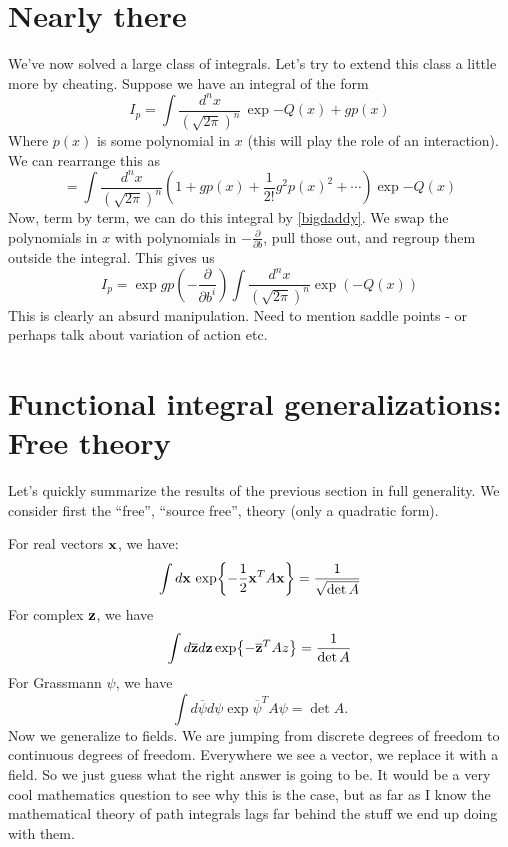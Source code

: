 \documentclass[main.tex]{subfiles}
\begin{document}
\section{Nearly there}
We've now solved a large class of integrals. Let's try to extend this class a little more by cheating. Suppose we have an integral of the form 
\[
I_p = \int \frac{d^n x}{(\sqrt{2\pi})^n} \, \exp{-Q(x) + g p(x)}
\]
Where $p(x)$ is some polynomial in $x$ (this will play the role of an interaction). We can rearrange this as 
\[
= \int \frac{d^n x}{(\sqrt{2\pi})^n} \left(
1 + g p(x) + \frac{1}{2!}g^2 p(x)^2 + \cdots 
\right) \exp{-Q(x)}
\]
Now, term by term, we can do this integral by \ref{bigdaddy}. We swap the polynomials in $x$ with polynomials in $-\frac{\partial}{\partial b}$, pull those out, and regroup them outside the integral. This gives us
\[
I_p = \exp{g p \left( -\frac{\partial}{\partial b^i} \right)} \int \frac{d^n x}{(\sqrt{2\pi})^n}\exp (-Q(x))
\]
This is clearly an absurd manipulation. Need to mention saddle points - or perhaps talk about variation of action etc.

\newpage
\section{Functional integral generalizations: Free theory}
Let's quickly summarize the results of the previous section in full generality. We consider first the ``free'', ``source free'', theory (only a quadratic form). 

For real vectors $\mathbf{x}$, we have:
\begin{equation}
\int d\mathbf{x} \, \exp{-\frac{1}{2} \mathbf{x}^T A \mathbf{x} } = \frac{1}{\sqrt{\det A}}
\end{equation}
For complex $\mathbf{z}$, we have
\begin{equation}
\int d\overline{\mathbf{z}} d\mathbf{z} \exp{-\overline{\mathbf{z}}^T A z } = \frac{1}{\det A}
\end{equation}
For Grassmann $\psi$, we have
\begin{equation}
\int d\overline{\psi} d\psi \exp{\overline{\psi}^T A \psi} = \det A.
\end{equation}
Now we generalize to fields. We are jumping from discrete degrees of freedom to continuous degrees of freedom. Everywhere we see a vector, we replace it with a field. So we just guess what the right answer is going to be. It would be a very cool mathematics question to see why this is the case, but as far as I know the mathematical theory of path integrals lags far behind the stuff we end up doing with them.
\end{document}
